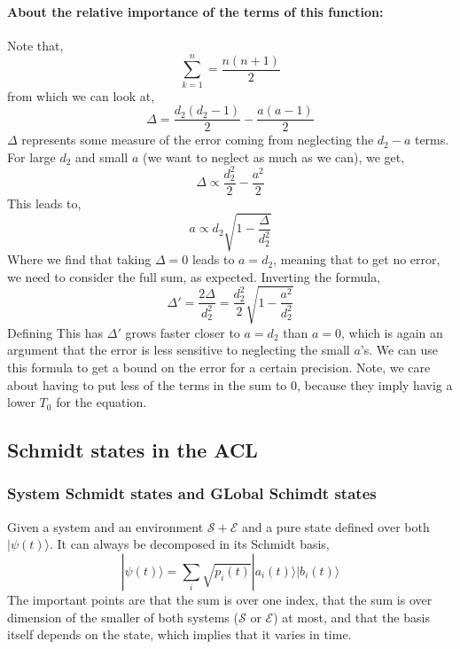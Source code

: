 \documentclass{article}
\begin{document}
\paragraph{About the relative importance of the terms of this function: }Note that,
\begin{equation}
    \sum^n_{k=1}=\frac{n(n+1)}{2}
\end{equation}
from which we can look at,
\begin{equation}
    \Delta=\frac{d_2(d_2-1)}{2}-\frac{a(a-1)}{2}
\end{equation}
$\Delta$ represents some measure of the error coming from neglecting the $d_2-a$ terms. 
For large $d_2$ and small $a$ (we want to neglect as much as we can), we get,
\begin{equation}
    \Delta\propto \frac{d^2_2}{2}-\frac{a^2}{2}
\end{equation}
This leads to,
\begin{equation}
    a\propto d_2\sqrt{1-\frac{\Delta}{d_2^2}}
\end{equation}
Where we find that taking $\Delta=0$ leads to $a=d_2$, meaning that to get no error, we need to consider the full sum, as expected.
Inverting the formula,
\begin{equation}
    \Delta'=\frac{2\Delta}{d_2^2}=\frac{d_2^2}{2}\sqrt{1-\frac{a^2}{d_2^2}} 
\end{equation}
Defining 
This has $\Delta'$ grows faster closer to $a=d_2$ than $a=0$, which is again an argument that the error is less sensitive to neglecting the small $a$'s.
We can use this formula to get a bound on the error for a certain precision. 
Note, we care about having to put less of the terms in the sum to 0, because they imply havig a lower $T_0$ for the equation. 

\subsection{Schmidt states in the ACL}

\subsubsection{System Schmidt states and GLobal Schimdt states}

Given a system and an environment $\mathcal{S} + \mathcal{E}$ and a pure state defined over both $|\psi(t)\rangle$. It can always be decomposed in its Schmidt basis,
\begin{equation}
    |\psi(t)\rangle = \sum_i \sqrt{p_i(t)}|a_i(t)\rangle|b_i(t)\rangle
\end{equation}
The important points are that the sum is over one index, that the sum is over dimension of the smaller of both systems ($\mathcal{S}$ or $\mathcal{E}$) at most, and that the basis itself depends on the state, which implies that it varies in time.
\end{document}
